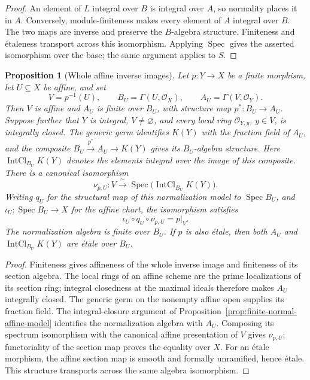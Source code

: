 \documentclass[11pt]{article}
\newtheorem{proposition}[theorem]{Proposition}
\theoremstyle{definition}
\theoremstyle{remark}
\DeclareMathOperator{\Spec}{Spec}
\begin{document}
\begin{proof}
An element of \(L\) integral over \(B\) is integral over \(A\),
so normality places it in \(A\). Conversely, module-finiteness makes
every element of \(A\) integral over \(B\). The two maps are inverse
and preserve the \(B\)-algebra structure. Finiteness and \'{e}taleness
transport across this isomorphism. Applying \(\Spec\) gives the
asserted isomorphism over the base; the same argument applies to \(S\).
\end{proof}

\begin{proposition}[Whole affine inverse images]
\label{prop:finite-affine-chart}
Let \(p:Y\to X\) be a finite morphism, let \(U\subseteq X\) be
affine, and set
\[
  V=p^{-1}(U),\qquad B_U=\Gamma(U,\mathcal O_X),\qquad
  A_U=\Gamma(V,\mathcal O_Y).
\]
Then \(V\) is affine and \(A_U\) is finite over \(B_U\), with
structure map \(p^*:B_U\to A_U\). Suppose further that \(Y\) is
integral, \(V\ne\varnothing\), and every local ring
\(\mathcal O_{Y,y}\), \(y\in V\), is integrally closed. The generic
germ identifies \(K(Y)\) with the fraction field of \(A_U\), and
the composite \(B_U\xrightarrow{p^*}A_U\to K(Y)\) gives its
\(B_U\)-algebra structure. Here \(\operatorname{IntCl}_{B_U}K(Y)\)
denotes the elements integral over the image of this composite.
There is a canonical isomorphism
\[
  \nu_{p,U}:V\xrightarrow{\ \sim\ }
  \Spec\bigl(\operatorname{IntCl}_{B_U}K(Y)\bigr).
\]
Writing \(q_U\) for the structural map of this normalization model
to \(\Spec B_U\), and \(\iota_U:\Spec B_U\to X\) for the affine
chart, the isomorphism satisfies
\[
  \iota_U\circ q_U\circ\nu_{p,U}=p|_V.
\]
The normalization algebra is finite over \(B_U\). If \(p\) is
also \'{e}tale, then both \(A_U\) and
\(\operatorname{IntCl}_{B_U}K(Y)\) are \'{e}tale over \(B_U\).
\end{proposition}

\begin{proof}
Finiteness gives affineness of the whole inverse image and finiteness
of its section algebra. The local rings of an affine scheme are the
prime localizations of its section ring; integral closedness at the
maximal ideals therefore makes \(A_U\) integrally closed. The generic
germ on the nonempty affine open supplies its fraction field.
The integral-closure argument of
Proposition~\ref{prop:finite-normal-affine-model} identifies the
normalization algebra with \(A_U\). Composing its spectrum
isomorphism with the canonical affine presentation of \(V\) gives
\(\nu_{p,U}\); functoriality of the section map proves the equality
over \(X\). For an \'{e}tale morphism, the affine section map is smooth
and formally unramified, hence \'{e}tale. This structure transports
across the same algebra isomorphism.
\end{proof}
\end{document}
